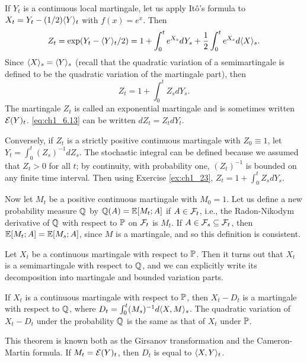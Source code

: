 If $Y_t$ is a continuous local martingale, let us apply It\^o's formula to $X_t = Y_t - (1/2)\lrang{Y}_t$ with $f(x) = e^x$. Then
\[
    Z_t = \exp(Y_t - \lrang{Y}_t/2) = 1 + \int_0^t e^{X_s}dY_s + \frac{1}{2}\int_0^t e^{X_s}d\lrang{X}_s.
\]
Since $\lrang{X}_s = \lrang{Y}_s$ (recall that the quadratic variation of a semimartingale is defined to be the quadratic variation of the martingale part), then
\begin{equation}\label{eq:ch1_6.13}
    Z_t = 1 + \int_0^t Z_s dY_s.
\end{equation}
The martingale $Z_t$ is called an exponential martingale and is sometimes written $\EC(Y)_t$. \eqref{eq:ch1_6.13} can be written $dZ_t = Z_t dY_t$.

Conversely, if $Z_t$ is a strictly positive continuous martingale with $Z_0 \equiv 1$, let $Y_t = \int_0^t (Z_s)^{-1}dZ_s$. The stochastic integral can be defined because we assumed that $Z_t > 0$ for all $t$; by continuity, with probability one, $(Z_t)^{-1}$ is bounded on any finite time interval. Then using Exercise \ref{ex:ch1_23}, $Z_t = 1 + \int_0^t Z_s dY_s$.

Now let $M_t$ be a positive continuous martingale with $M_0 = 1$. Let us define a new probability measure $\Q$ by $\Q(A) = \E[M_t; A]$ if $A \in \FC_t$, i.e., the Radon-Nikodym derivative of $\Q$ with respect to $\P$ on $\FC_t$ is $M_t$. If $A \in \FC_s \subseteq \FC_t$, then $\E[M_t; A] = \E[M_s; A]$, since $M$ is a martingale, and so this definition is consistent.

Let $X_t$ be a continuous martingale with respect to $\P$. Then it turns out that $X_t$ is a semimartingale with respect to $\Q$, and we can explicitly write its decomposition into martingale and bounded variation parts.

\begin{theorem}\label{thm:ch1_6.4}
If $X_t$ is a continuous martingale with respect to $\P$, then $X_t - D_t$ is a martingale with respect to $\Q$, where $D_t = \int_0^t (M_s)^{-1}d\lrang{X,M}_s$. The quadratic variation of $X_t - D_t$ under the probability $\Q$ is the same as that of $X_t$ under $\P$.
\end{theorem}

This theorem is known both as the Girsanov transformation and the Cameron-Martin formula. If $M_t = \EC(Y)_t$, then $D_t$ is equal to $\lrang{X,Y}_t$.

